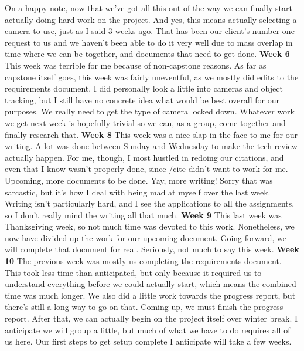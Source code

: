 \documentclass[onecolumn, draftclsnofoot,10pt, compsoc]{IEEEtran}
\begin{document}
\newline
On a happy note, now that we've got all this out of the way we can finally start actually doing hard work on the project. And yes, this means actually selecting a camera to use, just as I said 3 weeks ago. That has been our client's number one request to us and we haven't been able to do it very well due to mass overlap in time where we can be together, and documents that need to get done.
\newline
\textbf{Week 6}
\newline
This week was terrible for me because of non-capstone reasons. As far as capstone itself goes, this week was fairly uneventful, as we mostly did edits to the requirements document. I did personally look a little into cameras and object tracking, but I still have no concrete idea what would be best overall for our purposes.
\newline
We really need to get the type of camera locked down. Whatever work we get next week is hopefully trivial so we can, as a group, come together and finally research that.
\newline
\textbf{Week 8}
\newline
This week was a nice slap in the face to me for our writing. A lot was done between Sunday and Wednesday to make the tech review actually happen. For me, though, I most hustled in redoing our citations, and even that I know wasn't properly done, since /cite didn't want to work for me.
\newline
Upcoming, more documents to be done. Yay, more writing! Sorry that was sarcastic, but it's how I deal with being mad at myself over the last week. Writing isn't particularly hard, and I see the applications to all the assignments, so I don't really mind the writing all that much.
\newline
\textbf{Week 9}
\newline
This last week was Thanksgiving week, so not much time was devoted to this work. Nonetheless, we now have divided up the work for our upcoming document.
\newline
Going forward, we will complete that document for real.
\newline
Seriously, not much to say this week.
\newline
\textbf{Week 10}
\newline
The previous week was mostly us completing the requirements document. This took less time than anticipated, but only because it required us to understand everything before we could actually start, which means the combined time was much longer. We also did a little work towards the progress report, but there's still a long way to go on that.
\newline
Coming up, we must finish the progress report. After that, we can actually begin on the project itself over winter break. I anticipate we will group a little, but much of what we have to do requires all of us here. Our first steps to get setup complete I anticipate will take a few weeks.
\end{document}
